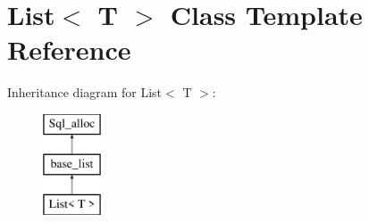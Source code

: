 \hypertarget{classList}{}\section{List$<$ T $>$ Class Template Reference}
\label{classList}
Inheritance diagram for List$<$ T $>$\+:\begin{figure}[H]
\begin{center}
\leavevmode
\includegraphics[height=3.000000cm]{classList}
\end{center}
\end{figure}
